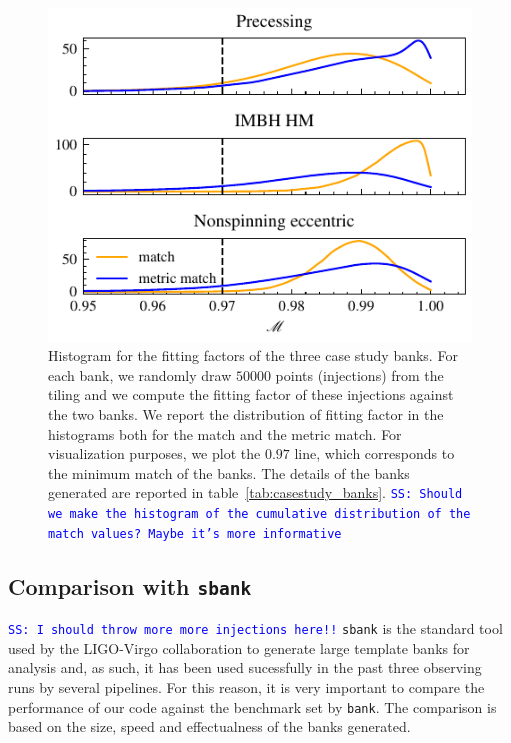 \documentclass[twocolumn,showpacs,preprintnumbers,nofootinbib,prd,
superscriptaddress,10pt]{revtex4-2}
\newcommand{\stefano}[1]{{\textcolor{blue}{\texttt{SS: #1}} }}
\begin{document}
\begin{figure}[t!]
	\includegraphics{bank_injections}
	\caption{
	Histogram for the fitting factors of the three case study banks. For each bank, we randomly draw $50000$ points (injections) from the tiling and we compute the fitting factor of these injections against the two banks. We report the distribution of fitting factor in the histograms both for the match and the metric match. For visualization purposes, we plot the $0.97$ line, which corresponds to the minimum match of the banks.
	The details of the banks generated are reported in table~\ref{tab:casestudy_banks}.
	\stefano{Should we make the histogram of the cumulative distribution of the match values? Maybe it's more informative}
	}
	\label{fig:bank_injections}
\end{figure}

\subsection{Comparison with \texttt{sbank} }\label{sec:sbank_comparison}

\stefano{I should throw more more injections here!!}
\texttt{sbank} \cite{sbank} is the standard tool used by the LIGO-Virgo collaboration to generate large template banks for analysis and, as such, it has been used sucessfully in the past three observing runs by several pipelines.
For this reason, it is very important to compare the performance of our code against the benchmark set by \texttt{bank}. The comparison is based on the size, speed and effectualness of the banks generated.
\end{document}
